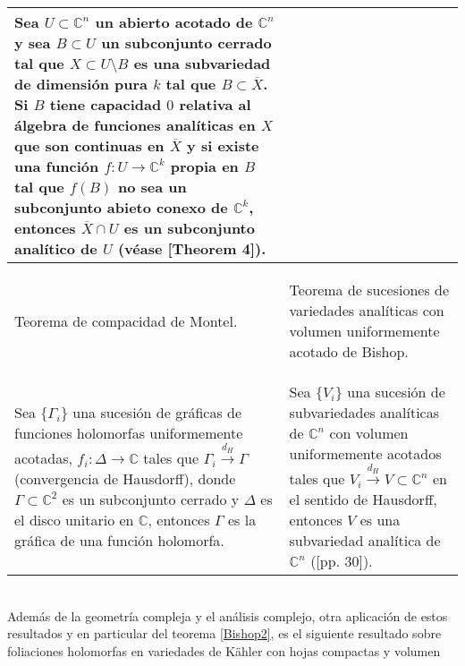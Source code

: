 \documentclass[letterpaper]{report}
\newcommand{\co}{\ensuremath{\mathbb C }}
\newcommand{\con}{\ensuremath{\mathbb{C}^n}}
\begin{document}
\begin{tabular}{| m{5.5cm} | m{5.5cm} |}
                        \vspace{0.1cm}
                        Sea $U\subset\con$ un abierto acotado de $\con$ y sea $B\subset U$ un subconjunto cerrado
                        tal que $X\subset U\setminus B$ es una subvariedad de dimensi\'on pura $k$ tal que $B\subset\overline{X}$. 
                        Si $B$ tiene capacidad $0$ relativa al \'algebra de funciones anal\'iticas en $X$ que son
                        continuas en $\overline{X}$ y si existe una funci\'on $f:U\rightarrow\co^k$ propia en $B$ tal que $f(B)$ 
                        no sea un subconjunto abieto conexo de $\co^k$, entonces $\overline{X}\cap U$ es un subconjunto anal\'itico
                        de $U$ (v\'ease \cite{Bishop}[Theorem 4]).\\ 
                        \hline 
                \begin{center} 
                        Teorema de compacidad de Montel. 
                \end{center} 
                        & 
                \begin{center}
                Teorema de sucesiones de variedades anal\'iticas con volumen uniformemente acotado de Bishop.
                \end{center}\\
                \hline 
                \vspace{0.1cm}
                Sea $\lbrace\Gamma_i\rbrace$ una sucesi\'on de gr\'aficas de funciones holomorfas uniformemente  
                acotadas, $f_i:\Delta\rightarrow\co$ tales que $\Gamma_i\overset{d_H}\longrightarrow\Gamma$ (convergencia de Hausdorff), 
                donde $\Gamma\subset\co^2$ es un subconjunto cerrado y $\Delta$ es el disco unitario en $\co$, 
                entonces $\Gamma$ es la gr\'afica de una funci\'on holomorfa.  
                        & 
                Sea $\lbrace V_i\rbrace$ una sucesi\'on de subvariedades anal\'iticas de $\con$ con volumen 
                uniformemente acotados tales que $V_i\overset{d_H}\longrightarrow V\subset\con$ en el sentido de Hausdorff, entonces 
                $V$ es una subvariedad anal\'itica de $\con$ (\cite{Stolzenberg}[pp. 30]). \\ \hline 
                
\end{tabular} 
\\
Adem\'as de la geometr\'ia compleja y el an\'alisis complejo, otra aplicaci\'on de estos resultados y en particular del teorema
\ref{Bishop2}, es el siguiente resultado sobre foliaciones holomorfas en variedades de K\"ahler con hojas compactas y volumen 
\end{document}
